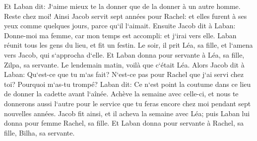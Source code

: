 \verse Et Laban dit: J`aime mieux te la donner que de la donner à un autre homme. Reste chez moi! 
\verse Ainsi Jacob servit sept années pour Rachel: et elles furent à ses yeux comme quelques jours, parce qu`il l`aimait. 
\verse Ensuite Jacob dit à Laban: Donne-moi ma femme, car mon temps est accompli: et j`irai vers elle. 
\verse Laban réunit tous les gens du lieu, et fit un festin. 
\verse Le soir, il prit Léa, sa fille, et l`amena vers Jacob, qui s`approcha d`elle. 
\verse Et Laban donna pour servante à Léa, sa fille, Zilpa, sa servante. 
\verse Le lendemain matin, voilà que c`était Léa. Alors Jacob dit à Laban: Qu`est-ce que tu m`as fait? N`est-ce pas pour Rachel que j`ai servi chez toi? Pourquoi m`as-tu trompé? 
\verse Laban dit: Ce n`est point la coutume dans ce lieu de donner la cadette avant l`aînée. 
\verse Achève la semaine avec celle-ci, et nous te donnerons aussi l`autre pour le service que tu feras encore chez moi pendant sept nouvelles années. 
\verse Jacob fit ainsi, et il acheva la semaine avec Léa; puis Laban lui donna pour femme Rachel, sa fille. 
\verse Et Laban donna pour servante à Rachel, sa fille, Bilha, sa servante. 
